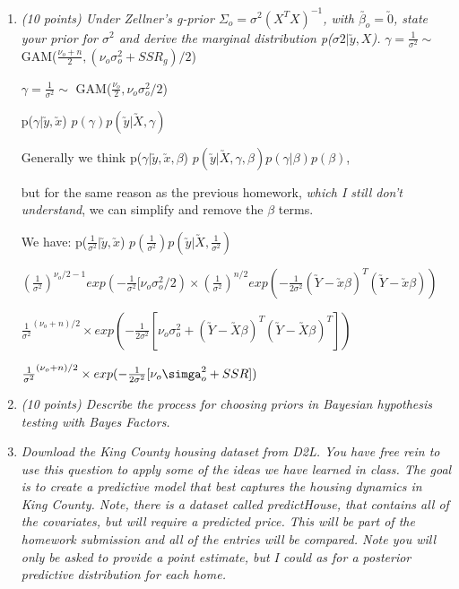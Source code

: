 \documentclass{article}\usepackage[]{graphicx}\usepackage[]{color}
\begin{document}
\begin{enumerate}
\item%
{\it (10 points) Under Zellner's g-prior $\Sigma_{o} = \sigma^2(X^{T}X)^{-1}$, with $\utilde{\beta_{o}} = \utilde{0}$, state your prior for $\sigma^{2}$ and derive the marginal distribution p($\sigma{2} | \utilde{y},X$).}
$\gamma = \frac{1}{\sigma^2} \sim$ GAM($\frac{\nu_{o} + n}{2},(\nu_{o}\sigma_{o}^{2} + SSR_{g})/2$)

$\gamma = \frac{1}{\sigma^{2}} \sim$ GAM($\frac{\nu_{o}}{2},\nu_{o}\sigma_{o}^{2}/2$)

p($\gamma | \utilde{y},\utilde{x}$) \propto $p(\gamma)p(\utilde{y} | \utilde{X},\gamma)$

Generally we think p($\gamma | \utilde{y},\utilde{x}, \beta$) \propto $p(\utilde{y} | \utilde{X},\gamma, \beta)p(\gamma | \beta)p(\beta)$,

but for the same reason as the previous homework, {\it which I still don't understand}, we can simplify and remove the $\beta$ terms.

We have:
p($\frac{1}{\sigma^2} | \utilde{y},\utilde{x}$) \propto $p(\frac{1}{\sigma^2})p(\utilde{y} | \utilde{X},\frac{1}{\sigma^2})$

\propto $(\frac{1}{\sigma^2})^{\nu_{o}/2 - 1}exp(-\frac{1}{\sigma^2}[\nu_{o}\sigma^2_{o}/2) \times (\frac{1}{\sigma^2})^{n/2}exp(-\frac{1}{2\sigma^2}(\utilde{Y} - \utilde{x}\beta)^{T}(\utilde{Y} - \utilde{x}\beta))$

\propto $\frac{1}{\sigma^2}^{(\nu_{o} + n)/2} \times exp(-\frac{1}{2\sigma^{2}}[\nu_{o}\sigma^2_{o} + (\utilde{Y} - \utilde{X}\beta)^{T}(\utilde{Y} - \utilde{X}\beta)^{T}])$

\propto $\frac{1}{\sigma^2}^{(\nu_{o} + n)/2} \times exp(-\frac{1}{2\sigma^{2}}[\nu_{o}\simga^2_{o} + SSR])$

\item {\it (10 points) Describe the process for choosing priors in Bayesian hypothesis testing with Bayes
Factors.}

\item {\it Download the King County housing dataset from D2L. You have free rein to use this question
to apply some of the ideas we have learned in class. The goal is to create a predictive model
that best captures the housing dynamics in King County. Note, there is a dataset called
predictHouse, that contains all of the covariates, but will require a predicted price. This will
be part of the homework submission and all of the entries will be compared. Note you will only
be asked to provide a point estimate, but I could as for a posterior predictive distribution for
each home.}


\end{enumerate}
\end{document}
